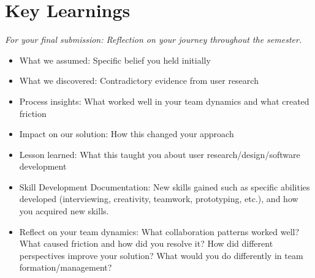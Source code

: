 \section{Key Learnings}
\emph{For your final submission: Reflection on your journey throughout the semester.}

\begin{itemize}
    \item What we assumed: Specific belief you held initially
    \item What we discovered: Contradictory evidence from user research
    \item Process insights: What worked well in your team dynamics and what created friction
    \item Impact on our solution: How this changed your approach
    \item Lesson learned: What this taught you about user research/design/software development
    \item Skill Development Documentation: New skills gained such as specific abilities developed (interviewing, creativity, teamwork, prototyping, etc.), and how you acquired new skills. 
    \item Reflect on your team dynamics: What collaboration patterns worked well? What caused friction and how did you resolve it? How did different perspectives improve your solution? What would you do differently in team formation/management?
\end{itemize}